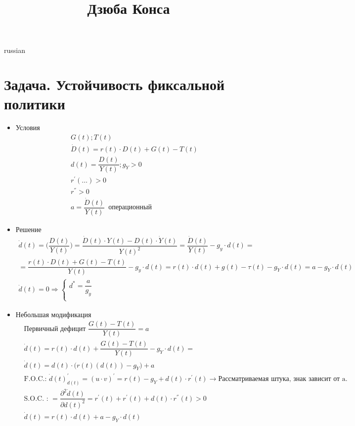 \documentclass{article}
\begin{document}
\title{\foreignlanguage{russian}{Дзюба Конса}}
\maketitle
\begin{otherlanguage*}{russian}
\section*{Задача. Устойчивость фиксальной политики}
\begin{itemize}
\item Условия 
\begin{align*}
G(t); T(t) \\
\dot D(t) = r(t) \cdot D(t) + G(t) - T(t) \\ 
d(t) = \dfrac{D(t) }{Y(t)}; g_Y > 0 \\ 
r^{'}(\ldots) > 0 \\ 
r^{''} > 0  \\
a = \dfrac{\dot D(t)}{Y(t)} \,\,\, \text{операционный} 
\end{align*}
\item Решение
\begin{align*}
\dot d (t) = \Big( \dfrac{D(t)}{Y(t)}\Big) = \dfrac{\dot D(t) \cdot Y(t) - D(t) \cdot \dot Y(t) }{Y(t)^2}  = \dfrac{\dot D(t)}{Y(t)} - g_y \cdot d(t) = \\
= \dfrac{r(t) \cdot D(t) + G(t) - T(t) }{Y(t)} - g_y \cdot d(t)= r(t) \cdot d(t) + g(t) - \tau(t) - g_Y \cdot d(t) = a - g_Y \cdot d(t)  \\
\dot d(t) = 0 \Rightarrow \begin{cases} 
d^* = \dfrac{a}{g_y} \\ 
\end{cases} 
\end{align*}
\item Небольшая модификация
\begin{align*}
& \text{Первичный дефицит } \dfrac{G(t) - T(t) }{Y(t)} = a \\
& \dot d(t) = r(t) \cdot d(t) + \dfrac{G(t) - T(t) }{Y(t)} - g_Y \cdot d(t) = \\
& \dot d(t) = d(t) \cdot \Big( r(t)  (d(t)) - g_Y \Big) + a \\
& \text{F.O.C.: } \dot d(t)^{'}_{d(t)} = (u \cdot v)^{'} = r(t) - g_Y + d(t) \cdot r^{'} (t)  \rightarrow \text{Рассматриваемая штука, знак зависит от a. } \\
& \text{S.O.C. : } = \dfrac{\partial ^ 2 \dot  d(t)}{\partial d(t) ^ 2}=  r^{'} (t) + r^{'} (t) + d(t) \cdot r^{''} (t)  > 0 \\
& \dot d(t) = r(t) \cdot d(t) +  a - g_Y \cdot d(t) 
\end{align*}

\end{itemize}
\end{otherlanguage*}
\end{document}
